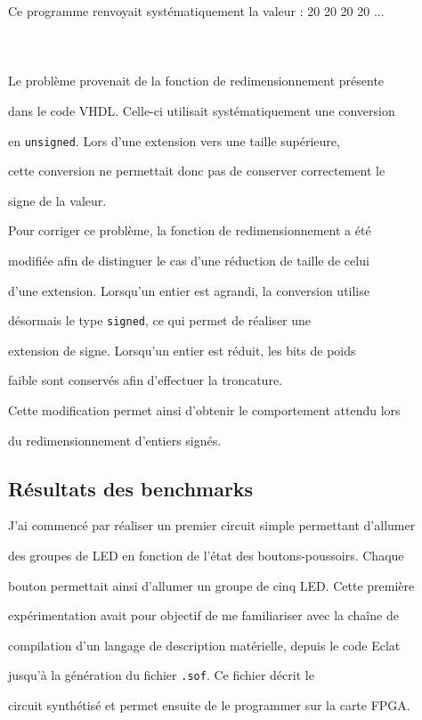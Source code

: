 \documentclass{article}
\begin{document}
Ce programme renvoyait systématiquement la valeur : 20 20 20 20 ...\\\\

\\\\

Le problème provenait de la fonction de redimensionnement présente

dans le code VHDL. Celle-ci utilisait systématiquement une conversion

en \texttt{unsigned}. Lors d'une extension vers une taille supérieure,

cette conversion ne permettait donc pas de conserver correctement le

signe de la valeur.

Pour corriger ce problème, la fonction de redimensionnement a été

modifiée afin de distinguer le cas d'une réduction de taille de celui

d'une extension. Lorsqu'un entier est agrandi, la conversion utilise

désormais le type \texttt{signed}, ce qui permet de réaliser une

extension de signe. Lorsqu'un entier est réduit, les bits de poids

faible sont conservés afin d'effectuer la troncature.

Cette modification permet ainsi d'obtenir le comportement attendu lors

du redimensionnement d'entiers signés.

\subsection{Résultats des benchmarks}

J'ai commencé par réaliser un premier circuit simple permettant d'allumer

des groupes de LED en fonction de l'état des boutons-poussoirs. Chaque

bouton permettait ainsi d'allumer un groupe de cinq LED. Cette première

expérimentation avait pour objectif de me familiariser avec la chaîne de

compilation d'un langage de description matérielle, depuis le code Eclat

jusqu'à la génération du fichier \texttt{.sof}. Ce fichier décrit le

circuit synthétisé et permet ensuite de le programmer sur la carte FPGA.
\end{document}
